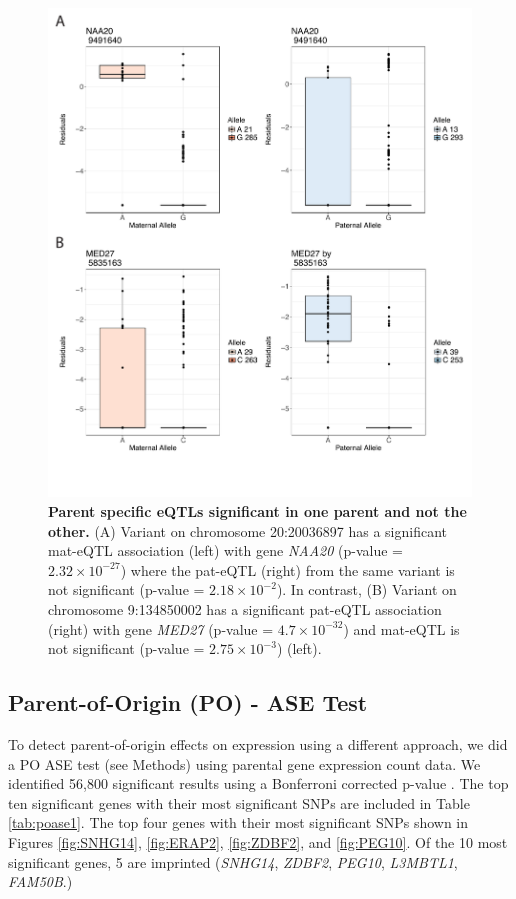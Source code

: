 \begin{figure}[!htb]
\centering \includegraphics[width=5in]{img/ch04/fig-07-sig_notsig.pdf}
\caption[Parent specific eQTLs significant in one parent and not the other.]{\textbf{Parent specific eQTLs significant in one parent and not the other.} (A) Variant on chromosome 20:20036897 has a significant mat-eQTL association (left) with gene \emph{NAA20} (p-value = $2.32 \times 10^{-27} $) where the pat-eQTL (right) from the same variant is not significant (p-value = $2.18 \times 10^{-2} $). In contrast, (B) Variant on chromosome 9:134850002 has a significant pat-eQTL association (right) with gene \emph{MED27} (p-value = $4.7 \times 10^{-32} $) and mat-eQTL is not significant (p-value = $2.75 \times 10^{-3} $) (left).}
\label{fig:sig_notsig}
\end{figure}


\subsection{Parent-of-Origin (PO) - ASE Test}\label{Parent-of-Origin (PO) - ASE Test} 

To detect parent-of-origin effects on expression using a different approach, we did a PO ASE test (see Methods) using parental gene expression count data. We identified 56,800 significant results using a Bonferroni corrected p-value . The top ten significant genes with their most significant SNPs are included in Table \ref{tab:poase1}. The top four genes with their most significant SNPs shown in Figures \ref{fig:SNHG14}, \ref{fig:ERAP2}, \ref{fig:ZDBF2}, and \ref{fig:PEG10}. Of the 10 most significant genes, 5 are imprinted (\emph{SNHG14}, \emph{ZDBF2}, \emph{PEG10}, \emph{L3MBTL1}, \emph{FAM50B}.)

